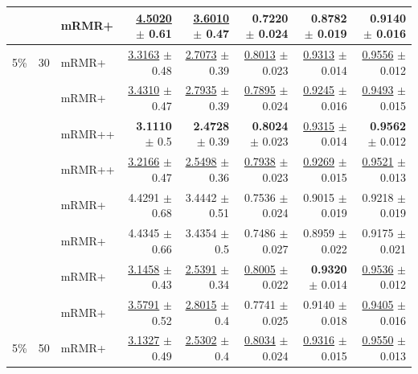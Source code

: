 \begin{longtable}{llp{}rrrrr}
 &  & mRMR+ & \underline{4.5020} {\scriptsize $\pm$ 0.61} & \underline{3.6010} {\scriptsize $\pm$ 0.47} & 0.7220 {\scriptsize $\pm$ 0.024} & 0.8782 {\scriptsize $\pm$ 0.019} & 0.9140 {\scriptsize $\pm$ 0.016} \\
\midrule
5\% & 30 & mRMR+ & \underline{3.3163} {\scriptsize $\pm$ 0.48} & \underline{2.7073} {\scriptsize $\pm$ 0.39} & \underline{0.8013} {\scriptsize $\pm$ 0.023} & \underline{0.9313} {\scriptsize $\pm$ 0.014} & \underline{0.9556} {\scriptsize $\pm$ 0.012} \\
 &  & mRMR+ & \underline{3.4310} {\scriptsize $\pm$ 0.47} & \underline{2.7935} {\scriptsize $\pm$ 0.39} & \underline{0.7895} {\scriptsize $\pm$ 0.024} & \underline{0.9245} {\scriptsize $\pm$ 0.016} & \underline{0.9493} {\scriptsize $\pm$ 0.015} \\
 &  & mRMR++ & \textbf{3.1110} {\scriptsize $\pm$ 0.5} & \textbf{2.4728} {\scriptsize $\pm$ 0.39} & \textbf{0.8024} {\scriptsize $\pm$ 0.023} & \underline{0.9315} {\scriptsize $\pm$ 0.014} & \textbf{0.9562} {\scriptsize $\pm$ 0.012} \\
 &  & mRMR++ & \underline{3.2166} {\scriptsize $\pm$ 0.47} & \underline{2.5498} {\scriptsize $\pm$ 0.36} & \underline{0.7938} {\scriptsize $\pm$ 0.023} & \underline{0.9269} {\scriptsize $\pm$ 0.015} & \underline{0.9521} {\scriptsize $\pm$ 0.013} \\
 &  & mRMR+ & 4.4291 {\scriptsize $\pm$ 0.68} & 3.4442 {\scriptsize $\pm$ 0.51} & 0.7536 {\scriptsize $\pm$ 0.024} & 0.9015 {\scriptsize $\pm$ 0.019} & 0.9218 {\scriptsize $\pm$ 0.019} \\
 &  & mRMR+ & 4.4345 {\scriptsize $\pm$ 0.66} & 3.4354 {\scriptsize $\pm$ 0.5} & 0.7486 {\scriptsize $\pm$ 0.027} & 0.8959 {\scriptsize $\pm$ 0.022} & 0.9175 {\scriptsize $\pm$ 0.021} \\
 &  & mRMR+ & \underline{3.1458} {\scriptsize $\pm$ 0.43} & \underline{2.5391} {\scriptsize $\pm$ 0.34} & \underline{0.8005} {\scriptsize $\pm$ 0.022} & \textbf{0.9320} {\scriptsize $\pm$ 0.014} & \underline{0.9536} {\scriptsize $\pm$ 0.012} \\
 &  & mRMR+ & \underline{3.5791} {\scriptsize $\pm$ 0.52} & \underline{2.8015} {\scriptsize $\pm$ 0.4} & 0.7741 {\scriptsize $\pm$ 0.025} & 0.9140 {\scriptsize $\pm$ 0.018} & \underline{0.9405} {\scriptsize $\pm$ 0.016} \\
\midrule
5\% & 50 & mRMR+ & \underline{3.1327} {\scriptsize $\pm$ 0.49} & \underline{2.5302} {\scriptsize $\pm$ 0.4} & \underline{0.8034} {\scriptsize $\pm$ 0.024} & \underline{0.9316} {\scriptsize $\pm$ 0.015} & \underline{0.9550} {\scriptsize $\pm$ 0.013} \\

\end{longtable}
